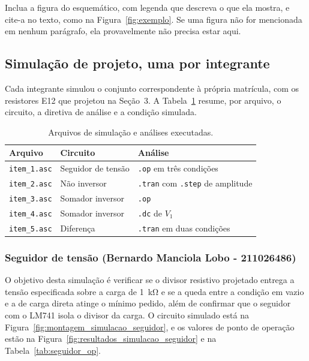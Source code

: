 \documentclass[11pt,a4paper]{article}
\begin{document}
Inclua a figura do esquemático, com legenda que descreva o que ela mostra, e cite-a no
texto, como na Figura~\ref{fig:exemplo}. Se uma figura não for mencionada em nenhum
parágrafo, ela provavelmente não precisa estar aqui.

\subsection{Simulação de projeto, uma por integrante}

Cada integrante simulou o conjunto correspondente à própria matrícula, com os resistores E12 que projetou na Seção~3. A Tabela~\ref{tab:simulacoes} resume, por arquivo, o circuito, a diretiva de análise e a condição simulada.

\begin{table}[h]
\centering
\caption{Arquivos de simulação e análises executadas.}
\label{tab:simulacoes}
\begin{tabular}{lll}
\hline
Arquivo & Circuito & Análise \\
\hline
\texttt{item\_1.asc} & Seguidor de tensão & \texttt{.op} em três condições \\
\texttt{item\_2.asc} & Não inversor & \texttt{.tran} com \texttt{.step} de amplitude \\
\texttt{item\_3.asc} & Somador inversor & \texttt{.op} \\
\texttt{item\_4.asc} & Somador inversor & \texttt{.dc} de $V_1$ \\
\texttt{item\_5.asc} & Diferença & \texttt{.tran} em duas condições \\
\hline
\end{tabular}
\end{table}

\subsubsection{Seguidor de tensão (Bernardo Manciola Lobo - 211026486)}

O objetivo desta simulação é verificar se o divisor resistivo projetado entrega a tensão especificada sobre a carga de \SI{1}{\kilo\ohm} e se a queda entre a condição em vazio e a de carga direta atinge o mínimo pedido, além de confirmar que o seguidor com o LM741 isola o divisor da carga. O circuito simulado está na Figura~\ref{fig:montagem_simulacao_seguidor}, e os valores de ponto de operação estão na Figura~\ref{fig:resultados_simulacao_seguidor} e na Tabela~\ref{tab:seguidor_op}.
\end{document}

